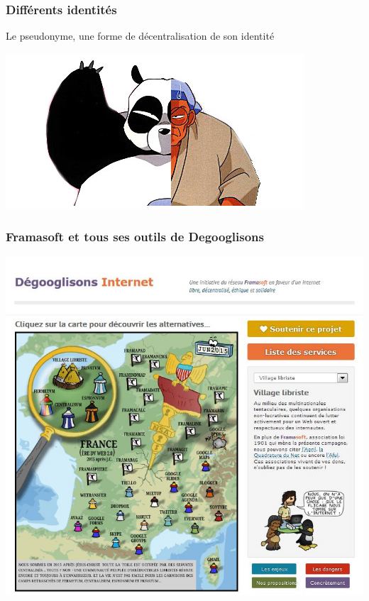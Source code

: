 \documentclass{beamer}
\begin{document}
\begin{frame}
\frametitle{Différents identités}
\begin{block}{Le pseudonyme, une forme de décentralisation de son identité}
\end{block}
\begin{center}
\includegraphics[scale=0.4]{./images/bannierepseudonymat.jpg}
\end{center}
\end{frame}

\begin{frame}
\begin{center}
\frametitle{Framasoft et tous ses outils de Degooglisons}
\includegraphics[scale=0.6] {./images/framasoft_degogglisons.jpg}
\end{center}
\end{frame}
\end{document}
